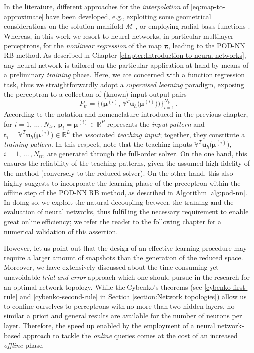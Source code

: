 \documentclass[12pt, a4paper, twoside, openright]{report}
\numberwithin{equation}{chapter}
\theoremstyle{theorem}
\theoremstyle{definition}
\theoremstyle{remark}
\theoremstyle{proposition}
\numberwithin{figure}{chapter}
\newcommand{\bg}[1]{\boldsymbol{#1}}
\begin{document}
		In the literature, different approaches for the \emph{interpolation} of \eqref{eq:map-to-approximate} have been developed, e.g., exploiting some geometrical considerations on the solution manifold $\mathcal{M}$ \cite{Ams10}, or employing radial basis functions \cite{Chen17}. Whereas, in this work we resort to neural networks, in particular multilayer perceptrons, for the \emph{nonlinear regression} of the map $\bg{\pi}$, leading to the POD-NN RB method. As described in Chapter \ref{chapter:Introduction to neural networks}, any neural network is tailored on the particular application at hand by means of a preliminary \emph{training} phase. Here, we are concerned with a function regression task, thus we straightforwardly adopt a \emph{supervised learning} paradigm, exposing the perceptron to a collection of (known) input-output pairs
		\begin{equation*}
			P_{tr} = \big\lbrace \big( \bg{\mu}^{(i)}, \, \mathbb{V}^T \mathbf{u}_h \big( \bg{\mu}^{(i)} \big) \big) \big\rbrace_{i = 1}^{N_{tr}} \, .
		\end{equation*} 
		According to the notation and nomenclature introduced in the previous chapter, for $i = 1, \, \ldots \, , N_{tr}$, $\mathbf{p}_i = \bg{\mu}^{(i)} \in \mathbb{R}^P$ represents the \emph{input pattern} and $\mathbf{t}_i =  \mathbb{V}^T \mathbf{u}_h \big( \bg{\mu}^{(i)} \big) \in \mathbb{R}^L$ the associated \emph{teaching input}; together, they constitute a \emph{training pattern}. In this respect, note that the teaching inputs $\mathbb{V}^T \mathbf{u}_h \big( \bg{\mu}^{(i)} \big)$, $i = 1, \, \ldots \, , N_{tr}$, are generated through the full-order solver. On the one hand, this ensures the reliability of the teaching patterns, given the assumed high-fidelity of the method (conversely to the reduced solver). On the other hand, this also highly suggests to incorporate the learning phase of the preceptron within the offline step of the POD-NN RB method, as described in Algorithm \ref{alg:pod-nn}. In doing so, we exploit the natural decoupling between the training and the evaluation of neural networks, thus fulfilling the necessary requirement to enable great online efficiency; we refer the reader to the following chapter for a numerical validation of this assertion. 
		
		However, let us point out that the design of an effective learning procedure may require a larger amount of snapshots than the generation of the reduced space. Moreover, we have extensively discussed about the time-consuming yet unavoidable \emph{trial}-\emph{and}-\emph{error} approach which one should pursue in the research for an optimal network topology. While the Cybenko's theorems (see \ref{cybenko-first-rule} and \ref{cybenko-second-rule} in Section \ref{section:Network topologies}) allow us to confine ourselves to perceptrons with no more than two hidden layers, no similar a priori and general results are available for the number of neurons per layer. Therefore, the speed up enabled by the employment of a neural network-based approach to tackle the \emph{online} queries comes at the cost of an increased \emph{offline} phase. 
		
\end{document}
